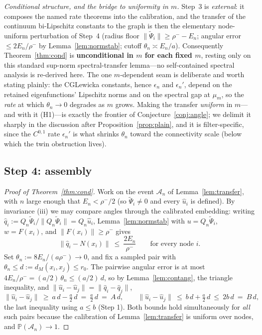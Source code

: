 \documentclass[11pt]{article}
\theoremstyle{remark}
\begin{document}
\smallskip\noindent\emph{Conditional structure, and the bridge to uniformity in
$m$.} Step~3 is \emph{external}: it composes the named rate theorems
\cite{calder2022,calderlewicka2022} into the calibration, and the transfer of the
continuum bi-Lipschitz constants to the graph is then the elementary
node-uniform perturbation of Step~4 (radius floor $\lVert\widetilde\Psi_i\rVert\ge
\rho^--E_n$; angular error $\le2E_n/\rho^-$ by Lemma~\ref{lem:normstab}; cutoff
$\theta_n\asymp E_n/a$). Consequently Theorem~\ref{thm:cond} is
\textbf{unconditional in $m$ for each fixed $m$}, resting only on this standard
sup-norm spectral-transfer lemma---no self-contained spectral analysis is
re-derived here. The one $m$-dependent seam is deliberate and worth stating
plainly: the CGLewicka constants, hence $\epsilon_n$ and $\epsilon_n'$, depend on
the retained eigenfunctions' Lipschitz norms and on the spectral gap at $\mu_m$,
so the \emph{rate} at which $\theta_n\to0$ degrades as $m$ grows. Making the
transfer \emph{uniform} in $m$---and with it (H1)---is exactly the frontier of
Conjecture~\ref{conj:angle}; we delimit it sharply in the discussion after
Proposition~\ref{prop:plain}, and it is filter-specific, since the $C^{0,1}$ rate
$\epsilon_n'$ is what shrinks $\theta_n$ toward the connectivity scale (below
which the twin obstruction lives).

\subsection*{Step 4: assembly}
\begin{proof}[Proof of Theorem~\ref{thm:cond}]
Work on the event $\mathcal A_n$ of Lemma~\ref{lem:transfer}, with $n$ large
enough that $E_n<\rho^-/2$ (so $\widetilde\Psi_i\ne0$ and every $\hat u_i$ is
defined). By invariance (iii) we may compare angles through the calibrated
embedding: writing $\hat q_i:=Q_n\widetilde\Psi_i/\lVert Q_n\widetilde\Psi_i
\rVert=Q_n\hat u_i$, Lemma~\ref{lem:normstab} with $u=Q_n\widetilde\Psi_i$,
$w=F(x_i)$, and $\lVert F(x_i)\rVert\ge\rho^-$ gives
\[
\lVert\hat q_i-N(x_i)\rVert\ \le\ \frac{2E_n}{\rho^-}
\qquad\text{for every node }i .
\]
Set $\theta_n:=8E_n/(a\rho^-)\to0$, and fix a sampled pair with
$\theta_n\le d:=d_M(x_i,x_j)\le r_0$. The pairwise angular error is at most
$4E_n/\rho^-=(a/2)\,\theta_n\le(a/2)\,d$, so by Lemma~\ref{lem:contang}, the
triangle inequality, and
$\lVert\hat u_i-\hat u_j\rVert=\lVert\hat q_i-\hat q_j\rVert$,
\[
\lVert\hat u_i-\hat u_j\rVert\ \ge\ a\,d-\tfrac a2\,d\ =\ \tfrac a2\,d\ =\ A\,d,
\qquad
\lVert\hat u_i-\hat u_j\rVert\ \le\ b\,d+\tfrac a2\,d\ \le\ 2b\,d\ =\ B\,d,
\]
the last inequality using $a\le b$ (Step 1). Both bounds hold simultaneously
for \emph{all} such pairs because the calibration of Lemma~\ref{lem:transfer}
is uniform over nodes, and $\mathbb P(\mathcal A_n)\to1$.
\end{proof}
\end{document}
